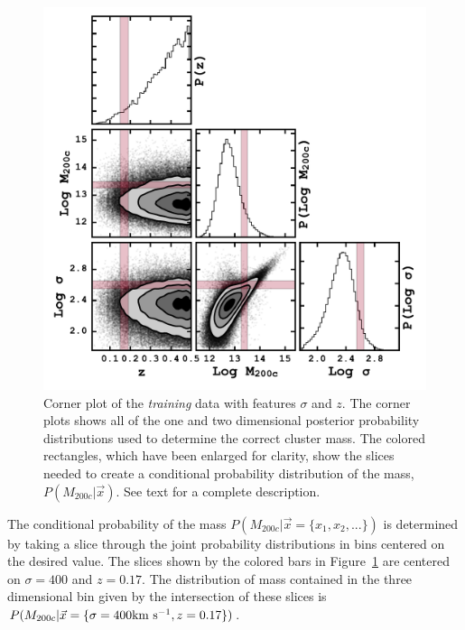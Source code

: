 \documentclass[fleqn,usenatbib]{mnras}
\begin{document}
\begin{figure} 
	\includegraphics[width=\columnwidth]{figures/cornertest.pdf} 
	\caption{Corner plot of the \emph{training} data with features $\sigma$ and $z$. The corner plots shows all of the one and two dimensional posterior probability distributions used to determine the correct cluster mass. The colored rectangles, which have been enlarged for clarity, show the slices needed to create a conditional probability distribution of the mass, $P(M_{200c}|\vec{x})$. See text for a complete description. } \label{fig: probability corner} 
\end{figure}

The conditional probability of the mass $P(M_{200c}|\vec{x}= \{ x_1,x_2,...\})$ is determined by taking a slice through the joint probability distributions in bins centered on the desired value. The slices shown by the colored bars in Figure~\ref{fig: probability corner} are centered on $\sigma = 400$ \kms and $z=0.17$. The distribution of mass contained in the three dimensional bin given by the intersection of these slices is $P(M_{200c}|\vec{x} = \{\sigma=400 \hbox{km~s$^{-1}$},z=0.17\})$.
\end{document}
